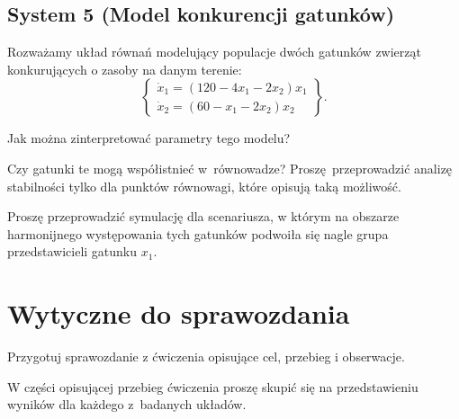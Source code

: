 \documentclass{sprawozdanie-agh}
\begin{document}
        \subsection{System 5 (Model konkurencji gatunków)} \label{sec:posrednia_5}
        Rozważamy układ równań modelujący populacje dwóch gatunków zwierząt konkurujących o zasoby na danym terenie:
        \begin{equation}
            \label{eq:posrednia_5}
            \left\{
            \begin{array}{l}
                 \dot{x}_{1} = (120 - 4x_1-2x_2)x_1\\
                 \dot{x}_{2} = (60 - x_1 - 2x_2)x_2
            \end{array}
            \right\}.
        \end{equation}

        Jak można zinterpretować parametry tego modelu? 
        
        Czy gatunki te mogą współistnieć w~równowadze? Proszę przeprowadzić analizę stabilności tylko dla punktów równowagi, które opisują taką możliwość.

        Proszę przeprowadzić symulację dla scenariusza, w którym na obszarze harmonijnego występowania tych gatunków
        podwoiła się nagle grupa przedstawicieli gatunku $x_1$. 

\newpage
\section{Wytyczne do sprawozdania}
    Przygotuj sprawozdanie z ćwiczenia opisujące cel, przebieg i obserwacje.
    
    W części opisującej przebieg ćwiczenia proszę skupić się na przedstawieniu
    wyników dla każdego z~badanych układów.
\end{document}
